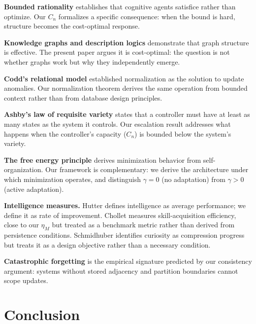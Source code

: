 \documentclass[11pt]{article}
\theoremstyle{definition}
\theoremstyle{remark}
\begin{document}
\textbf{Bounded rationality} \cite{Simon1955} establishes that
cognitive agents satisfice rather than optimize. Our $C_n$ formalizes
a specific consequence: when the bound is hard, structure becomes the
cost-optimal response.

\textbf{Knowledge graphs and description logics}
\cite{Hogan2021,Pearl1988,BaaderCalvaneseEtAl2003,BernersLee2001}
demonstrate that graph structure is effective. The present paper argues
it is cost-optimal: the question is not whether graphs work but why
they independently emerge.

\textbf{Codd's relational model} \cite{Codd1970} established
normalization as the solution to update anomalies. Our normalization
theorem derives the same operation from bounded context rather than
from database design principles.

\textbf{Ashby's law of requisite variety} \cite{Ashby1956} states
that a controller must have at least as many states as the system it
controls. Our escalation result addresses what happens when the
controller's capacity ($C_n$) is bounded below the system's variety.

\textbf{The free energy principle} \cite{Friston2010} derives
minimization behavior from self-organization. Our framework is
complementary: we derive the architecture under which minimization
operates, and distinguish $\gamma = 0$ (no adaptation) from
$\gamma > 0$ (active adaptation).

\textbf{Intelligence measures.}
Hutter \cite{Hutter2005} defines intelligence as average performance;
we define it as rate of improvement. Chollet \cite{Chollet2019}
measures skill-acquisition efficiency, close to our $\eta_M$ but
treated as a benchmark metric rather than derived from persistence
conditions. Schmidhuber \cite{Schmidhuber2010} identifies curiosity
as compression progress but treats it as a design objective rather
than a necessary condition.

\textbf{Catastrophic forgetting}
\cite{McCloskey1989,Kirkpatrick2017} is the empirical signature
predicted by our consistency argument: systems without stored
adjacency and partition boundaries cannot scope updates.

\section{Conclusion}
\label{sec:conclusion}
\end{document}
